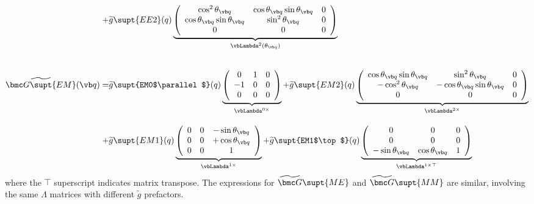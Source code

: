 \documentclass[letterpaper]{article}
\renewcommand{\wt}{\widetilde}
\begin{document}
\begin{align*}
  +&\wt{g}\supt{EE2}(q)
    \underbrace{
   \left(\begin{array}{ccc}
    \cos^2\theta_{\vb q}  & \cos\theta_{\vb q} \sin\theta_{\vb q} & 0 \\
    \cos\theta_{\vb q} \sin\theta_{\vb q} & \sin^2\theta_{\vb q}  & 0 \\
    0                     & 0                    & 0 
   \end{array}\right)
               }_{\vbLambda^{2}(\theta_{\vb q})}
\\[20pt]
 \wt{\bmc G\supt{EM}}(\vb q)
 = &\wt g\supt{EM0$\parallel$}(q)
    \underbrace{ \left(\begin{array}{ccc}
                       0 & 1 & 0 \\ 
                      -1 & 0 & 0 \\ 
                       0 & 0 & 0 
                 \end{array}\right)
               }_{\vbLambda^{0\times}}
  +\wt g\supt{EM2}(q)
   \underbrace{
   \left(\begin{array}{ccc}
    \cos\theta_{\vb q} \sin\theta_{\vb q} & \sin^2\theta_{\vb q} & 0 \\
    -\cos^2\theta_{\vb q} & -\cos\theta_{\vb q} \sin\theta_{\vb q} & 0 \\
    0                     & 0                    & 0 
   \end{array}\right)
              }_{\vbLambda^{2\times}}
\\[10pt]
  + &\wt g\supt{EM1}(q)
   \underbrace{
    \left(\begin{array}{ccc}
    0 & 0 & -\sin\theta_{\vb q} \\
    0 & 0 & +\cos\theta_{\vb q} \\
    0 & 0 & 1
   \end{array}\right)
              }_{\vbLambda^{1\times}}
  + \wt g\supt{EM1$\top$}(q)
   \underbrace{
    \left(\begin{array}{ccc}
    0 & 0 & 0 \\
    0 & 0 & 0 \\
   -\sin\theta_{\vb q} & \cos\theta_{\vb q} & 1
   \end{array}\right)
              }_{\vbLambda^{1\times\top}}
\end{align*}
where the $\top$ superscript indicates matrix transpose.
The expressions for $\wt{\bmc G}\supt{ME}$ and $\wt{\bmc G}\supt{MM}$
are similar, involving the same $\Lambda$ matrices with different
$\wt{g}$ prefactors.
\end{document}
